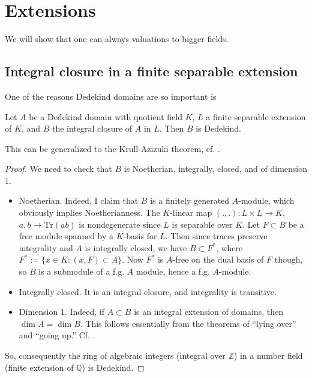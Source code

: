 \section{Extensions}

We will show that one can always   valuations to bigger fields.  
\subsection{Integral closure in a finite separable extension}

One of the reasons Dedekind domains are so important is
\begin{theorem} \label{intclosdedekind} Let $A$ be a Dedekind domain with quotient field $K$, $L$ a finite separable extension of $K$, and $B$ the integral closure of $A$ in $L$.  Then $B$ is Dedekind.
\end{theorem}

This can be generalized to the Krull-Azizuki theorem, cf. \cite{Bo68}.

\begin{proof}  We need to check that $B$ is Noetherian, integrally, closed, and of dimension 1.

\begin{itemize}
\item Noetherian.  Indeed, I claim that $B$ is a finitely generated $A$-module, which obviously implies Noetherianness.  The $K$-linear map $(.,.): L \times L \to K$, $a,b \to \mathrm{Tr}(ab)$ is nondegenerate since $L$ is separable over $K$.  Let $F \subset B$ be a free module spanned by a $K$-basis for $L$.  Then since traces preserve integrality and $A$ is integrally closed, we have $B \subset F^*$, where $F^* := \{ x \in K: (x,F) \subset A \}$.  Now $F^*$ is $A$-free on the dual basis of $F$ though, so $B$ is a submodule of a f.g. $A$ module, hence a f.g. $A$-module.
\item Integrally closed.  It is an integral closure, and integrality is transitive.
\item Dimension 1.  Indeed, if $A \subset B$ is an integral extension of
domains, then $\dim A = \dim B$. This follows essentially from the theorems of
``lying over'' and ``going up.'' Cf. \cite{Ei95}.
\end{itemize}

So, consequently the ring of algebraic integers (integral over $\mathbb{Z}$) in a number field (finite extension of $\mathbb{Q}$) is Dedekind.
\end{proof}


